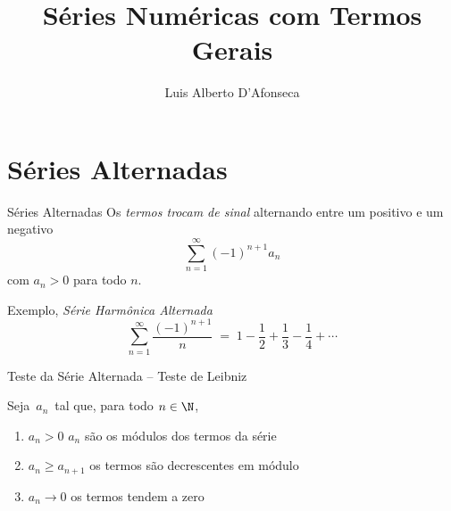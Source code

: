 
\usepackage{apresentacao}
\usepackage{tabto}

\graphicspath{{./figs/}}

\newcommand{\mytitle}   {Séries Numéricas com Termos Gerais}
\newcommand{\mysubtitle}{}
\title   {\mytitle}
\subtitle{\mysubtitle}
\author  {\large Luis Alberto D'Afonseca}
\date    {}



\begin{frame}
    \titlepage
\end{frame}

\section{Séries Alternadas}

\begin{frame}{Séries Alternadas}
  Os \emph{termos trocam de sinal} alternando entre um positivo e um negativo
  \[ \sum_{n=1}^\infty (-1)^{n+1} a_n \]
  com $a_n >0$ para todo $n$.

  \pause
  \vspace{\baselineskip}
  Exemplo, \emph{Série Harmônica Alternada}
  \[ \sum_{n=1}^\infty \frac{(-1)^{n+1}}{n}  \;=\; 1 - \frac{1}{2} + \frac{1}{3} - \frac{1}{4} + \cdots \]
\end{frame}

\begin{frame}[t]{Teste da Série Alternada -- Teste de Leibniz}

  \vspace{\baselineskip}
  Seja $\,a_n\,$ tal que, para todo $ n \in \N$,

  \pause
  \vspace{0.5\baselineskip}
  \begin{enumerate}[<+->]
      \item $a_n>0$           \tabto{30mm} $a_n$ são os módulos dos termos da série  \\[2mm]
      \item $a_n\geq a_{n+1}$ \tabto{30mm} os termos são decrescentes em módulo      \\[2mm]
      \item $a_n\to 0$        \tabto{30mm} os termos tendem a zero
  \end{enumerate}

\end{frame}

